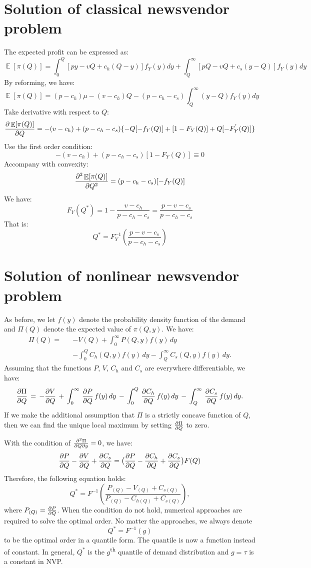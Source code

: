 \documentclass{article}
\DeclareMathOperator{\E}{\mathbb{E}}
\begin{document}
\section{Solution of classical newsvendor problem} 

The expected profit can be expressed as:
\[
    \E[\pi(Q)]=\int_{0}^{Q}[py-vQ+c_h(Q-y)]f_{Y}(y)dy+\int_{Q}^{\infty}[pQ-vQ+c_s(y-Q)]f_{Y}(y)dy
\]
By reforming, we have:
\[
    \E[\pi(Q)]=(p-c_h)\mu-(v-c_h)Q-(p-c_h-c_s)\int_{Q}^{\infty}(y-Q)f_{Y}(y)dy
\]
Take derivative with respect to $Q$:
\[
    \pdv{\E[\pi(Q)]}{Q}=-(v-c_h)+(p-c_h-c_s)\{-Q[-f_{Y}(Q)]+[1-F_{Y}(Q)]+Q[-F_{Y}^{'}(Q)]\}
\]
Use the first order condition:
\[
    -(v-c_h)+(p-c_h-c_s)[1-F_{Y}(Q)]\equiv0
\]
Accompany with convexity:
\[
    \pdv[2]{\E[\pi(Q)]}{Q}=(p-c_h-c_s)[-f_{Y}(Q)]
\]
We have:
\[
    F_{Y}(Q^{*})=1-\frac{v-c_h}{p-c_h-c_s} =\frac{p-v-c_s}{p-c_h-c_s}
\]
That is:
\[
    Q^*=F_{Y}^{-1}\left(\frac{p-v-c_s}{p-c_h-c_s}\right)
\]

\section{Solution of nonlinear newsvendor problem} \label{app:A}

As before, we let $f(y)$ denote the probability density function of the demand and $\Pi(Q)$ denote the expected value of $\pi(Q,y)$. We have:
\begin{eqnarray*}
\Pi(Q) = && -V(Q)
+ \int_0^\infty P(Q,y) f(y) \, dy \\
&& - \int_0^Q C_h(Q,y) f(y) \, dy 
 - \int_Q^\infty C_s(Q,y) f(y) \, dy.
\end{eqnarray*}
Assuming that the functions $P$, $V$, $C_h$ and $C_s$ are everywhere differentiable, we have:
\[
\pdv{\Pi}{Q} \, = \, -\pdv{V}{Q} \, + \,
\int_0^\infty \, \pdv{P}{Q} \, f(y) \, dy
\, - \,
\int_0^Q \, \pdv{C_h}{Q} \, f(y) \, dy
\, - \,
\int_Q^\infty \, \pdv{C_s}{Q} \, f(y) \, dy.
\]
If we make the additional assumption that $\Pi$ is a strictly concave function of $Q$, then we can find the unique local maximum by setting $\pdv{\Pi}{Q}$ to zero.

With the condition of $\pdv{\Pi}{Q}{y}=0$, we have:
\[
    \pdv{P}{Q}-\pdv{V}{Q}+\pdv{C_s}{Q}=\big(\pdv{P}{Q}-\pdv{C_h}{Q}+\pdv{C_s}{Q}\big)F(Q)
\]
Therefore, the following equation holds:
\[
    Q^*=F^{-1}\left(\frac{P_{(Q)}-V_{(Q)}+C_{s(Q)}}{P_{(Q)}-C_{h(Q)}+C_{s(Q)}}\right),
\]
where $P_{(Q)}=\pdv{P}{Q}$. When the condition do not hold, numerical approaches are required to solve the optimal order. No matter the approaches, we always denote
\[
    Q^*=F^{-1}(g)
\]
to be the optimal order in a quantile form. The quantile is now a function instead of constant. In general, $Q^*$ is the $g$\textsuperscript{th} quantile of demand distribution and $g=\tau$ is a constant in NVP.
\end{document}
